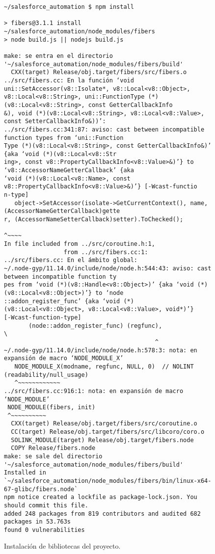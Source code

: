 \begin{figure}
\footnotesize
\begin{verbatim}
~/salesforce_automation $ npm install

> fibers@3.1.1 install ~/salesforce_automation/node_modules/fibers
> node build.js || nodejs build.js

make: se entra en el directorio '~/salesforce_automation/node_modules/fibers/build'
  CXX(target) Release/obj.target/fibers/src/fibers.o
../src/fibers.cc: En la función ‘void uni::SetAccessor(v8::Isolate*, v8::Local<v8::Object>, 
v8::Local<v8::String>, uni::FunctionType (*)(v8::Local<v8::String>, const GetterCallbackInfo
&), void (*)(v8::Local<v8::String>, v8::Local<v8::Value>, const SetterCallbackInfo&))’:
../src/fibers.cc:341:87: aviso: cast between incompatible function types from ‘uni::Function
Type (*)(v8::Local<v8::String>, const GetterCallbackInfo&)’ {aka ‘void (*)(v8::Local<v8::Str
ing>, const v8::PropertyCallbackInfo<v8::Value>&)’} to ‘v8::AccessorNameGetterCallback’ {aka
‘void (*)(v8::Local<v8::Name>, const v8::PropertyCallbackInfo<v8::Value>&)’} [-Wcast-functio
n-type]
   object->SetAccessor(isolate->GetCurrentContext(), name, (AccessorNameGetterCallback)gette
r, (AccessorNameSetterCallback)setter).ToChecked();
                                                                                       ^~~~~
In file included from ../src/coroutine.h:1,
                 from ../src/fibers.cc:1:
../src/fibers.cc: En el ámbito global:
~/.node-gyp/11.14.0/include/node/node.h:544:43: aviso: cast between incompatible function ty
pes from ‘void (*)(v8::Handle<v8::Object>)’ {aka ‘void (*)(v8::Local<v8::Object>)’} to ‘node
::addon_register_func’ {aka ‘void (*)(v8::Local<v8::Object>, v8::Local<v8::Value>, void*)’} 
[-Wcast-function-type]
       (node::addon_register_func) (regfunc),                          \
                                           ^
~/.node-gyp/11.14.0/include/node/node.h:578:3: nota: en expansión de macro ‘NODE_MODULE_X’
   NODE_MODULE_X(modname, regfunc, NULL, 0)  // NOLINT (readability/null_usage)
   ^~~~~~~~~~~~~
../src/fibers.cc:916:1: nota: en expansión de macro ‘NODE_MODULE’
 NODE_MODULE(fibers, init)
 ^~~~~~~~~~~
  CXX(target) Release/obj.target/fibers/src/coroutine.o
  CC(target) Release/obj.target/fibers/src/libcoro/coro.o
  SOLINK_MODULE(target) Release/obj.target/fibers.node
  COPY Release/fibers.node
make: se sale del directorio '~/salesforce_automation/node_modules/fibers/build'
Installed in `~/salesforce_automation/node_modules/fibers/bin/linux-x64-67-glibc/fibers.node`
npm notice created a lockfile as package-lock.json. You should commit this file.
added 248 packages from 819 contributors and audited 682 packages in 53.763s
found 0 vulnerabilities
\end{verbatim}
\caption{Instalación de bibliotecas del proyecto.}
\label{npm}
\end{figure}

